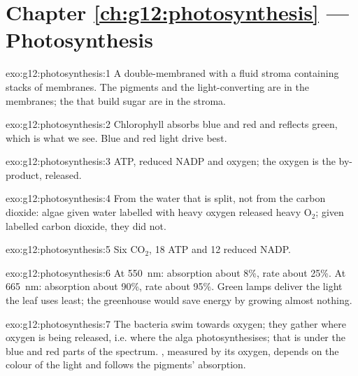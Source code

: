 \section*{Chapter \ref{ch:g12:photosynthesis} --- Photosynthesis}

\begin{solution}{exo:g12:photosynthesis:1}
A double-membraned  with a fluid stroma containing stacks of
 membranes. The pigments and the light-converting 
are in the  membranes; the  that build sugar are in
the stroma.
\end{solution}

\begin{solution}{exo:g12:photosynthesis:2}
Chlorophyll absorbs blue and red and reflects green, which is what we
see. Blue and red light drive  best.
\end{solution}

\begin{solution}{exo:g12:photosynthesis:3}
ATP, reduced NADP and oxygen; the oxygen is the by-product, released.
\end{solution}

\begin{solution}{exo:g12:photosynthesis:4}
From the water that is split, not from the carbon dioxide: algae given
water labelled with heavy oxygen released heavy $\mathrm{O_2}$; given
labelled carbon dioxide, they did not.
\end{solution}

\begin{solution}{exo:g12:photosynthesis:5}
Six $\mathrm{CO_2}$, 18 ATP and 12 reduced NADP.
\end{solution}

\begin{solution}{exo:g12:photosynthesis:6}
At \qty{550}{nm}: absorption about 8\%, rate about 25\%. At
\qty{665}{nm}: absorption about 90\%, rate about 95\%. Green lamps
deliver the light the leaf uses least; the greenhouse would save
energy by growing almost nothing.
\end{solution}

\begin{solution}{exo:g12:photosynthesis:7}
The bacteria swim towards oxygen; they gather where oxygen is being
released, i.e. where the alga photosynthesises; that is under the blue
and red parts of the spectrum. , measured by its oxygen,
depends on the colour of the light and follows the pigments'
absorption.
\end{solution}

